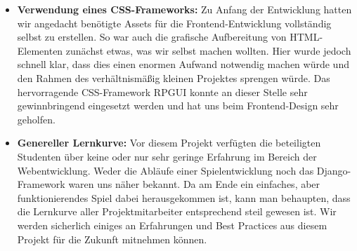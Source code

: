\begin{itemize}
    \item \textbf{Verwendung eines CSS-Frameworks:} Zu Anfang der Entwicklung hatten wir angedacht benötigte Assets für die Frontend-Entwicklung vollständig selbst zu erstellen. So war auch die grafische Aufbereitung von HTML-Elementen zunächst etwas, was wir selbst machen wollten. Hier wurde jedoch schnell klar, dass dies einen enormen Aufwand notwendig machen würde und den Rahmen des verhältnismäßig kleinen Projektes sprengen würde. Das hervorragende CSS-Framework RPGUI konnte an dieser Stelle sehr gewinnbringend eingesetzt werden und hat uns beim Frontend-Design sehr geholfen.
    
    \item \textbf{Genereller Lernkurve:} Vor diesem Projekt verfügten die beteiligten Studenten über keine oder nur sehr geringe Erfahrung im Bereich der Webentwicklung. Weder die Abläufe einer Spielentwicklung noch das Django-Framework waren uns näher bekannt. Da am Ende ein einfaches, aber funktionierendes Spiel dabei herausgekommen ist, kann man behaupten, dass die Lernkurve aller Projektmitarbeiter entsprechend steil gewesen ist. Wir werden sicherlich einiges an Erfahrungen und Best Practices aus diesem Projekt für die Zukunft mitnehmen können.   

\end{itemize}

